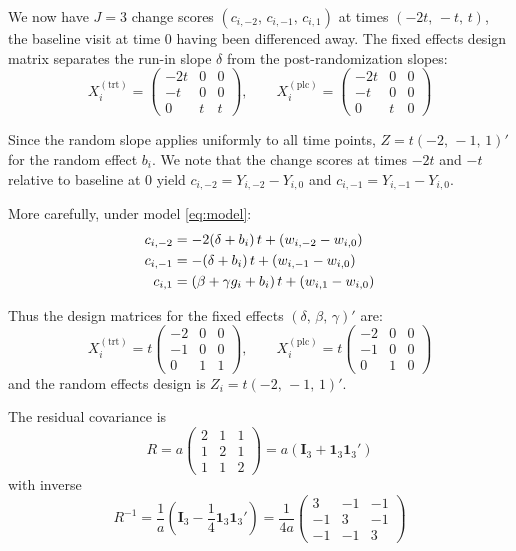 \documentclass[
  11pt,
]{article}
\begin{document}
We now have \(J = 3\) change scores \((c_{i,-2},\, c_{i,-1},\,
c_{i,1})\) at times \((-2t,\, -t,\, t)\), the baseline visit at
time \(0\) having been differenced away. The fixed effects
design matrix separates the run-in slope \(\delta\) from the
post-randomization slopes:
\[
  X_i^{(\text{trt})} = \begin{pmatrix}
    -2t & 0 & 0 \\ -t & 0 & 0 \\ 0 & t & t
  \end{pmatrix}, \qquad
  X_i^{(\text{plc})} = \begin{pmatrix}
    -2t & 0 & 0 \\ -t & 0 & 0 \\ 0 & t & 0
  \end{pmatrix}
\]

Since the random
slope applies uniformly to all time points, \(Z = t(-2,\, -1,
\, 1)'\) for the random effect \(b_i\). We note that the
change scores at times \(-2t\) and \(-t\) relative to baseline
at \(0\) yield \(c_{i,-2} = Y_{i,-2} - Y_{i,0}\) and
\(c_{i,-1} = Y_{i,-1} - Y_{i,0}\).

More carefully, under model \eqref{eq:model}:
\begin{align}
  c_{i,-2} &= -2(\delta + b_i)\,t + (w_{i,-2} - w_{i,0})
    \notag \\
  c_{i,-1} &= -(\delta + b_i)\,t + (w_{i,-1} - w_{i,0})
    \notag \\
  c_{i,1}  &= (\beta + \gamma g_i + b_i)\,t
    + (w_{i,1} - w_{i,0})
  \label{eq:c_r2}
\end{align}

Thus the design matrices for the fixed effects
\((\delta,\, \beta,\, \gamma)'\) are:
\[
  X_i^{(\text{trt})} = t\begin{pmatrix}
    -2 & 0 & 0 \\ -1 & 0 & 0 \\ 0 & 1 & 1
  \end{pmatrix}, \qquad
  X_i^{(\text{plc})} = t\begin{pmatrix}
    -2 & 0 & 0 \\ -1 & 0 & 0 \\ 0 & 1 & 0
  \end{pmatrix}
\]
and the random effects design is
\(Z_i = t(-2,\, -1,\, 1)'\).

The residual covariance is
\begin{equation}
  R = a\begin{pmatrix}
    2 & 1 & 1 \\ 1 & 2 & 1 \\ 1 & 1 & 2
  \end{pmatrix}
  = a(\mathbf{I}_3 + \mathbf{1}_3\mathbf{1}_3')
\end{equation}
with inverse
\begin{equation}
  R^{-1} = \frac{1}{a}\left(\mathbf{I}_3
    - \frac{1}{4}\mathbf{1}_3\mathbf{1}_3'\right)
  = \frac{1}{4a}\begin{pmatrix}
    3 & -1 & -1 \\ -1 & 3 & -1 \\ -1 & -1 & 3
  \end{pmatrix}
\end{equation}
\end{document}
